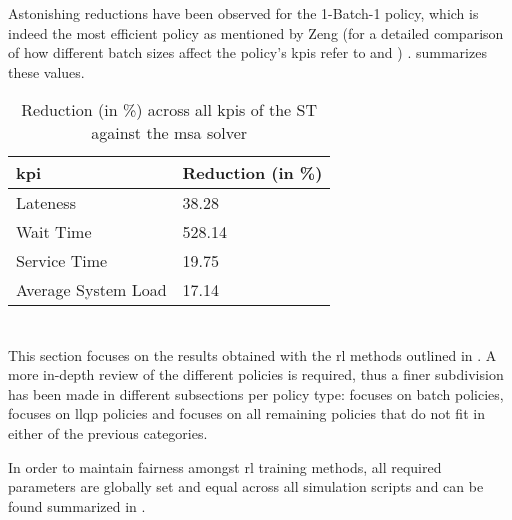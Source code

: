 \documentclass{seal_thesis}
\begin{document}

Astonishing reductions have been observed for the 1-Batch-1 policy, which is indeed the most efficient policy as mentioned by Zeng (for a detailed comparison of how different batch sizes affect the policy's \glspl{kpi} refer to  and ) \cite[p. 24]{Zeng2005}.  summarizes these values.

\begin{table}[!ht]
\centering
\begin{tabular}{@{}ll@{}}
\toprule
\gls{kpi}                 & Reduction (in \%) \\ \midrule
Lateness            & 38.28             \\
Wait Time           & 528.14             \\
Service Time        & 19.75             \\
Average System Load & 17.14             \\ \bottomrule
\end{tabular}
\caption{Reduction (in \%) across all \glspl{kpi} of the ST against the \gls{msa} solver}
\label{tab:opt_kpis_comp_gain}
\end{table}

\clearpage

\section{}
\label{sec:rl_results}

This section focuses on the results obtained with the \gls{rl} methods outlined in . A more in-depth review of the different policies is required, thus a finer subdivision has been made in different subsections per policy type:  focuses on batch policies,  focuses on \gls{llqp} policies and  focuses on all remaining policies that do not fit in either of the previous categories.

In order to maintain fairness amongst \gls{rl} training methods, all required parameters are globally set and equal across all simulation scripts and can be found summarized in .
\end{document}
